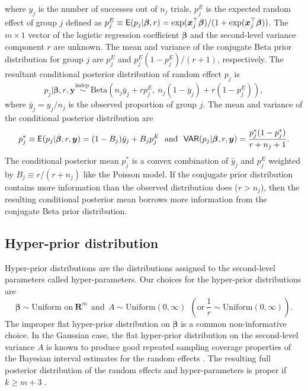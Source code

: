 \documentclass[article]{jss}
\begin{document}
where $y_{j}$  is the number of successes  out of $n_{j}$ trials, $p^E_j$ is the expected random effect  of group $j$ defined as $p^E_j\equiv \mathsf{E}(p_j\vert \boldsymbol{\beta}, r)=\exp(\boldsymbol{x}_j^\top\boldsymbol{\beta})/(1+\exp(\boldsymbol{x}_j^\top\boldsymbol{\beta}))$. The $m\times 1$ vector of the logistic regression coefficient $\boldsymbol{\beta}$ and the second-level variance component $r$ are unknown. The mean and variance of the conjugate Beta prior distribution for group $j$ are $p^E_j$ and $p^E_j(1-p^E_j)/(r+1)$, respectively.  The resultant conditional posterior distribution of random effect $p_j$  is
\begin{equation} \label{betapost}
p_{j}\vert  \boldsymbol{\beta}, r, \boldsymbol{y} \stackrel{\textrm{indep.}}{\sim}\textrm{Beta}(n_{j}\bar{y}_{j}+rp^E_j,~n_{j}(1-\bar{y}_{j})+r(1-p^E_j)),
\end{equation}
where $\bar{y}_j=y_j/n_j$ is the observed proportion of group $j$. The mean and variance of the conditional posterior distribution are
\begin{equation}\label{betapost_mean_var}
p_j^\ast\equiv \mathsf{E}(p_j\vert \boldsymbol{\beta}, r, \boldsymbol{y} )=(1-B_{j})\bar{y}_{j} + B_{j}p^E_j~~\textrm{and}~~\mathsf{VAR}(p_j\vert  \boldsymbol{\beta}, r,  \boldsymbol{y})=\frac{p_j^\ast(1-p_j^\ast)}{r+n_j+1}.
\end{equation}
The conditional posterior mean $p_j^\ast$ is  a convex combination of $\bar{y}_{j}$ and $p^E_j$ weighted by $B_j\equiv r / (r + n_j)$ like the Poisson model.  If the conjugate prior distribution contains more information than the observed distribution does ($r>n_j$), then the resulting conditional posterior mean borrows more information from the conjugate Beta prior distribution.

\subsection[Hyper-prior distributions]{Hyper-prior distribution}
Hyper-prior distributions are the distributions assigned to the second-level parameters called hyper-parameters. Our choices for the hyper-prior distributions are
\begin{equation}\label{eq:hyper}
\boldsymbol{\beta} \sim \textrm{Uniform on}~ \textbf{R}^{m}~~\textrm{and}~~A \sim \textrm{Uniform}(0, \infty) ~~(\textrm{or} ~\frac{1}{r}\sim \textrm{Uniform}(0, \infty)).
\end{equation}
The improper flat hyper-prior distribution on $\boldsymbol{\beta}$ is a common non-informative choice.  In the Gaussian case, the flat hyper-prior distribution on the second-level variance $A$ is known to produce good repeated sampling coverage properties of the Bayesian interval estimates for the random effects \citep{tang2011, morris2012, kelly2014advances}. The resulting full posterior distribution of the random effects and hyper-parameters is proper if $k\ge m+3$ \citep{tang2011, kelly2014advances}. 
\end{document}
